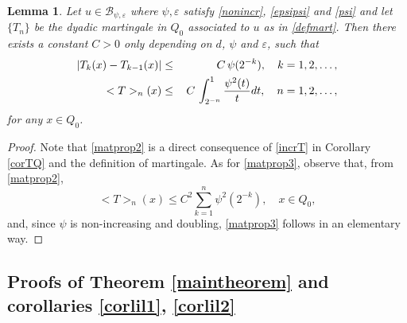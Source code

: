 \documentclass[11pt,letterpaper]{amsart}
\newtheorem{lem}{Lemma}[section]
\theoremstyle{definition}
\numberwithin{equation}{section}
\begin{document}
\begin{lem} \label{martpropert2}
\noindent
Let $u\in  \mathcal{B}_{\psi , \varepsilon }$ where $\psi , \varepsilon$ satisfy \eqref{nonincr}, \eqref{epsipsi} and \eqref{psi} and let $\{ T_n \}$ be the dyadic martingale in $Q_0$ associated to $u$ as in \eqref{defmart}. Then there exists a constant $C>0$ only depending on $d$, $\psi$ and $\varepsilon$, such that 
\begin{eqnarray}
 |T_k (x) - T_{k-1} (x)|  & \leq &    C \, \psi (2^{-k}), \quad k=1,2,\ldots ,  \label{matprop2} \vspace{0.3cm}\\
 <T>_n (x) & \leq  & \,    C \,   \displaystyle \int_{2^{-n}}^1 \frac{\psi^2 (t)}{t} dt, 
 \quad n=1,2,\ldots  \label{matprop3}, 
\end{eqnarray}
for any $x \in Q_0$.
\end{lem}

\begin{proof}

Note that \eqref{matprop2} is a direct consequence of  \eqref{incrT} in Corollary \ref{corTQ} and the definition of martingale. As for \eqref{matprop3}, observe that, from \eqref{matprop2},
$$
<T>_n (x) \leq C^2 \sum_{k=1}^n \psi^2 (2^{-k}), \quad x \in Q_0, 
$$
and, since $\psi$ is non-increasing and doubling, \eqref{matprop3} follows in an elementary way.
\end{proof}

\subsection{Proofs of Theorem \ref{maintheorem} and corollaries \ref{corlil1}, \ref{corlil2} }
\end{document}
